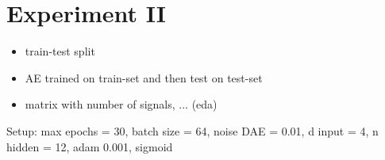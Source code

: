 
\section{Experiment II}

\begin{itemize}
\item train-test split
\item AE trained on train-set and then test on test-set
\item matrix with number of signals, ... (eda)
\end{itemize}

Setup: max epochs = 30, batch size = 64, noise DAE = 0.01, d input = 4, n hidden = 12, adam 0.001, sigmoid

